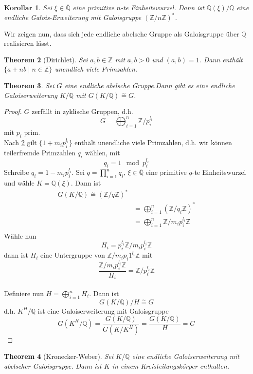 \documentclass[10pt,a4paper]{article}
\newcommand{\Z}{\ensuremath{\mathbb{Z}}}
\newcommand{\Q}{\ensuremath{\mathbb{Q}}}
\newcommand{\ol}[1]{\overline{#1}}
\newcommand{\isom}{\overset{\sim}{=}}
\theoremstyle{plain}
\newtheorem{theorem}{Theorem}[section]
\newtheorem{kor}[theorem]{Korollar}
\theoremstyle{definition}
\theoremstyle{remark}
\begin{document}
	
	\begin{kor}
		Sei $\xi\in\ol \Q$ eine primitive $n$-te Einheitswurzel. Dann ist $\Q(\xi)/\Q$ eine endliche Galois-Erweiterung mit Galoisgruppe $(\Z/n\Z)^*$.
	\end{kor}
	
	Wir zeigen nun, dass sich jede endliche abelsche Gruppe als Galoisgruppe über $\Q$ realisieren lässt.
	
	\begin{theorem}[Dirichlet]\label{satz:Dirichlet}
		Sei $a,b\in\Z$ mit $a,b>0$ und $(a,b)=1$. Dann enthält $\{a+nb\mid n\in\Z\}$ unendlich viele Primzahlen.
	\end{theorem}

	\begin{theorem}
		Sei $G$ eine endliche abelsche Gruppe.Dann gibt es eine endliche Galoiserweiterung $K/\Q$ mit $G(K/\Q)\isom G$.
	\end{theorem}
	\begin{proof}
		$G$ zerfällt in zyklische Gruppen, d.h.\[G=\bigoplus_{i=1}^n \Z/p_i^{l_i}\]
		mit $p_i$ prim.\\
		Nach \ref{satz:Dirichlet} gilt $\{1+m_ip_i^{l_i}\}$ enthält unendliche viele Primzahlen, d.h. wir können  teilerfremde Primzahlen $q_i$ wählen, mit
		\[q_i=1\mod p_i^{l_i}\]
		Schreibe $q_i=1-m_ip_i^{l_i}$. Sei $q=\prod_{i=1}^n q_i$, $\xi\in\ol{\Q}$ eine primitive $q$-te Einheitswurzel und wähle $K=\Q(\xi)$. Dann ist
		\begin{align*}
		G(K/\Q)\isom \left(\Z/q\Z \right)^*\\
		&=\bigoplus_{i=1}^n\left(\Z/q_i\Z\right)^*\\
		&=\bigoplus_{i=1}^n\Z/m_ip_i^{l_i}\Z\\
		\end{align*}
		Wähle nun
		\[H_i=p_i^{l_i}\Z/m_ip_i^{l_i}\Z\]
		dann ist $H_i$ eine Untergruppe von $\Z/m_ip_i1^{l_i}\Z$ mit
		\[\frac{\Z/m_ip_i^{l_i}\Z}{H_i}=\Z/p_i^{l_i}\Z\]
		\\
		Definiere nun $H=\bigoplus_{i=1}^n H_i$. Dann ist
		\[G(K/\Q)/H\isom G\]
		d.h. $K^H/\Q$ ist eine Galoiserweiterung mit Galoisgruppe
		\[G(K^H/\Q)=\frac{G(K/\Q)}{G(K/K^H)}=\frac{G(K/\Q)}{H}=G\] 
	\end{proof}


	\begin{theorem}[Kronecker-Weber]
		Sei $K/\Q$ eine endliche Galoiserweiterung mit abelscher Galoisgruppe. Dann ist $K$ in einem Kreisteilungskörper enthalten.
	\end{theorem}
\end{document}

